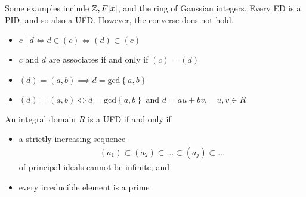 \documentclass{memoir}
\begin{document}
Some examples include \(\mathbb{Z}, F[x]\), and the ring of Gaussian integers. Every ED is a PID, and so also a UFD. However, the converse does not hold.
\begin{thm}
	\begin{itemize}
		\item \(c \mid d \iff d \in (c) \iff (d) \subset (c)\)
		\item \(c\) and \(d\) are associates if and only if \((c) = (d)\)
		\item \((d) = (a,b) \implies d = \textrm{gcd}\left\{ a,b \right\} \) 
		\item \((d) = (a,b) \iff d = \textrm{gcd}\left\{ a,b \right\}  \text{ and }d = au + bv, \quad u,v \in R\)
	\end{itemize}
\end{thm}
\begin{thm}[UFD]
	An integral domain \(R\) is a UFD if and only if
	\begin{itemize}
		\item a strictly increasing sequence
			\begin{align*}
				(a_1) \subset (a_2)  \subset  \ldots \subset (a_j) \subset \ldots
			\end{align*}
			of principal ideals cannot be infinite; and
		\item every irreducible element is a prime
	\end{itemize}
\end{thm}
\end{document}
